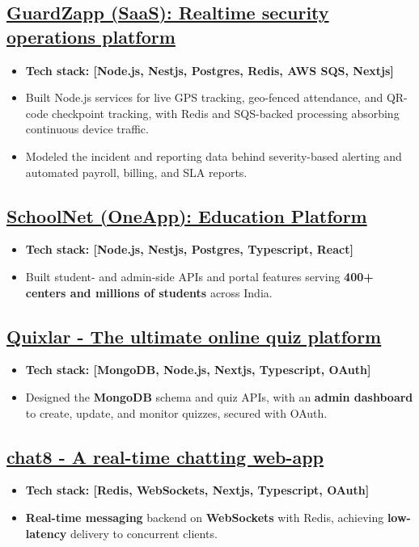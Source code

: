 \documentclass[letter,10pt]{article}
\newenvironment{zitemize}{%
\begin{itemize} \itemsep 0pt \parskip 0pt \parsep 1pt}
{\end{itemize}\vspace{-.5em}}
\begin{document}
\subsection{\href{https://www.guardzapp.com/}{GuardZapp (SaaS): Realtime security operations platform}}
\begin{zitemize}
\item \textbf{Tech stack: [Node.js, Nestjs, Postgres, Redis, AWS SQS, Nextjs]}
\item Built Node.js services for live GPS tracking, geo-fenced attendance, and QR-code checkpoint tracking, with Redis and SQS-backed processing absorbing continuous device traffic.
\item Modeled the incident and reporting data behind severity-based alerting and automated payroll, billing, and SLA reports.
\end{zitemize}

\subsection{\href{https://www.schoolnetindia.com/}{SchoolNet (OneApp): Education Platform}}
\begin{zitemize}
\item \textbf{Tech stack: [Node.js, Nestjs, Postgres, Typescript, React]}
\item Built student- and admin-side APIs and portal features serving \textbf{400+ centers and millions of students} across India.
\end{zitemize}

\subsection{\href{https://quixlar.vercel.app/}{Quixlar - The ultimate online quiz platform}}
\begin{zitemize}
\item \textbf{Tech stack: [MongoDB, Node.js, Nextjs, Typescript, OAuth]}
\item Designed the \textbf{MongoDB} schema and quiz APIs, with an \textbf{admin dashboard} to create, update, and monitor quizzes, secured with OAuth.
\end{zitemize}


\subsection{\href{https://github.com/OvaisKhanday/chat8}{chat8 - A real-time chatting web-app}}
\begin{zitemize}
\item \textbf{Tech stack: [Redis, WebSockets, Nextjs, Typescript, OAuth]}
\item \textbf{Real-time messaging} backend on \textbf{WebSockets} with Redis, achieving \textbf{low-latency} delivery to concurrent clients.
\end{zitemize}
\end{document}
